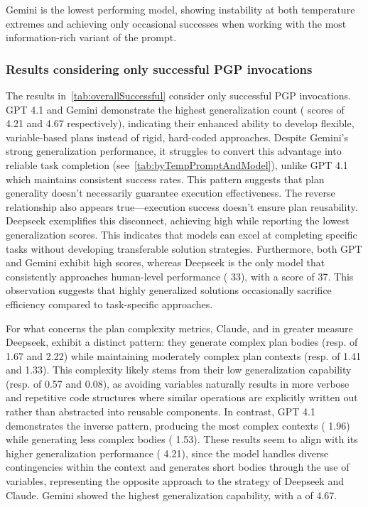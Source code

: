 \documentclass[12pt,a4paper,openright,twoside]{book}
\begin{document}
Gemini is the lowest performing model, showing instability at both temperature extremes and achieving only occasional successes when working with the most information-rich variant of the prompt.

\subsubsection{Results considering only successful PGP invocations}

The results in~\cref{tab:overallSuccessful} consider only successful \ac{PGP} invocations. 
%
GPT 4.1 and Gemini demonstrate the highest generalization count (\GC{} scores of 4.21 and 4.67 respectively), indicating their enhanced ability to develop flexible, variable-based plans instead of rigid, hard-coded approaches.
%
Despite Gemini's strong generalization performance, it struggles to convert this advantage into reliable task completion (see~\cref{tab:byTempPromptAndModel}), unlike GPT 4.1 which maintains consistent success rates. 
%
This pattern suggests that plan generality doesn't necessarily guarantee execution effectiveness.
%
The reverse relationship also appears true---execution success doesn't ensure plan reusability.
%
Deepseek exemplifies this disconnect, achieving high \TSR{} while reporting the lowest generalization scores. 
%
This indicates that models can excel at completing specific tasks without developing transferable solution strategies.
%
Furthermore, both GPT and Gemini exhibit high \GAT{} scores, whereas Deepseek is the only model that consistently approaches human-level performance (\GAT{} 33), with a score of 37.
%
This observation suggests that highly generalized solutions occasionally sacrifice efficiency compared to task-specific approaches.

For what concerns the plan complexity metrics, Claude, and in greater measure Deepseek, exhibit a distinct pattern: they generate complex plan bodies (resp. \PBC{} of 1.67 and 2.22) while maintaining moderately complex plan contexts (resp. \CC{} of 1.41 and 1.33).
%
This complexity likely stems from their low generalization capability (resp. \GC{} of 0.57 and 0.08), as avoiding variables naturally results in more verbose and repetitive code structures where similar operations are explicitly written out rather than abstracted into reusable components.
%
In contrast, GPT 4.1 demonstrates the inverse pattern, producing the most complex contexts (\CC{} 1.96) while generating less complex bodies (\PBC{} 1.53). 
%
These results seem to align with its higher generalization performance (\GC{} 4.21), since the model handles diverse contingencies within the context and generates short bodies through the use of variables, representing the opposite approach to the strategy of Deepseek and Claude.
%
Gemini showed the highest generalization capability, with a \GC{} of 4.67.
\end{document}
